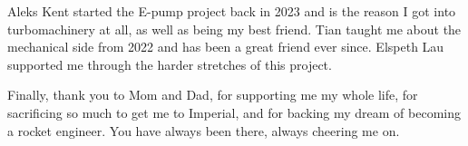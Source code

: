 Aleks Kent started the E-pump project back in 2023 and is the reason I got into turbomachinery at all, as well as being my best friend. Tian taught me about the mechanical side from 2022 and has been a great friend ever since. Elspeth Lau supported me through the harder stretches of this project.

Finally, thank you to Mom and Dad, for supporting me my whole life, for sacrificing so much to get me to Imperial, and for backing my dream of becoming a rocket engineer. You have always been there, always cheering me on.
